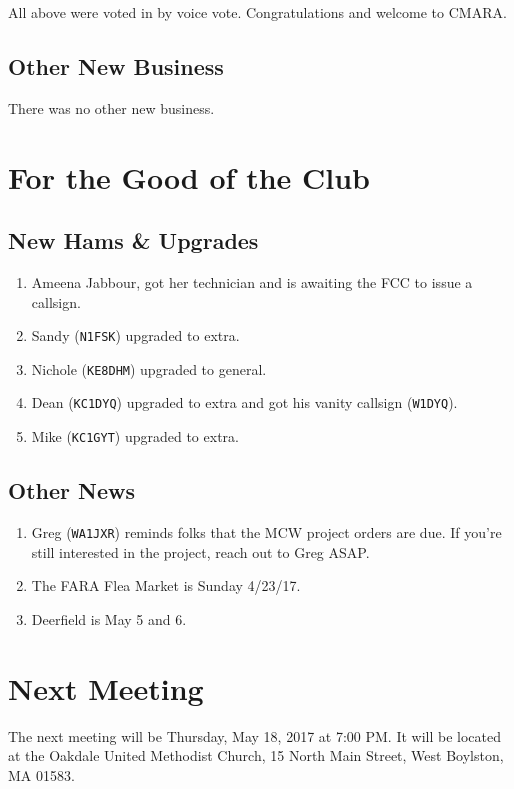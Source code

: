 \documentclass[10pt,letterpaper]{article}
\begin{document}
All above were voted in by voice vote. Congratulations and welcome to CMARA.

\subsection{Other New Business}
There was no other new business.

\section{For the Good of the Club}

\subsection{New Hams \& Upgrades}

\begin{enumerate}
  \item Ameena Jabbour, got her technician and is awaiting the FCC to issue a callsign.
  \item Sandy (\texttt{N1FSK}) upgraded to extra.
  \item Nichole (\texttt{KE8DHM}) upgraded to general.
  \item Dean (\texttt{KC1DYQ}) upgraded to extra and got his vanity callsign (\texttt{W1DYQ}).
  \item Mike (\texttt{KC1GYT}) upgraded to extra.
\end{enumerate}

\subsection{Other News}
\begin{enumerate}
\item Greg (\texttt{WA1JXR}) reminds folks that the MCW project orders are due. If you're still interested in the project, reach out to Greg ASAP.
\item The FARA Flea Market is Sunday 4/23/17.
\item Deerfield is May 5 and 6.
\end{enumerate}

\section{Next Meeting}
The next meeting will be Thursday, May 18, 2017 at 7:00 PM. It will be located at the Oakdale United Methodist Church, 15 North Main Street, West Boylston, MA 01583.\\
\end{document}
